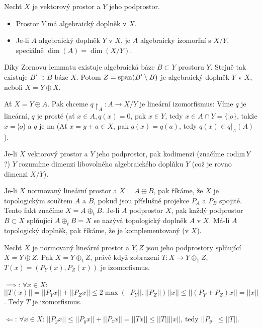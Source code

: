\documentclass[12pt]{article}					%
\begin{document}
\begin{veta}
	Nechť $X$ je vektorový prostor a $Y$ jeho podprostor.

	\begin{itemize}
		\item Prostor $Y$ má algebraický doplněk v $X$.
		\item Je-li $A$ algebraický doplněk $Y$ v $X$, je $A$ algebraicky izomorfní s $X / Y$, speciálně $\dim(A) = \dim(X / Y)$.
	\end{itemize}

	\begin{dukazin}
		Díky Zornovu lemmatu existuje algebraická báze $B \subset Y$ prostoru $Y$. Stejně tak existuje $B' \supset B$ báze $X$. Potom $Z = \operatorname{span}(B' \setminus B)$ je algebraický doplněk $Y$ v $X$, neboli $X = Y \oplus X$.


		Ať $X = Y \oplus A$. Pak chceme $q\upharpoonright_A: A \rightarrow X / Y$ je lineární izomorfismus: Víme $q$ je lineární, $q$ je prosté (ať $x \in A, q(x) = 0$, pak $x \in Y$, tedy $x \in A \cap Y = \{¦o\}$, takže $x = ¦o$) a $q$ je na (Ať $x = y + a \in X$, pak $q(x) = q(a)$, tedy $q(x) \in q|_A(A)$). 
	\end{dukazin}
\end{veta}

\begin{definice}[Kodimenze]
	Je-li $X$ vektorový prostor a $Y$ jeho podprostor, pak kodimenzí (značíme $\operatorname{codim} Y$?) $Y$ rozumíme dimenzi libovolného algebraického doplňku $Y$ (což je rovno dimenzi $X / Y$).
\end{definice}

\begin{definice}
	Je-li $X$ normovaný lineární prostor a $X = A \oplus B$, pak říkáme, že $X$ je topologickým součtem $A$ a $B$, pokud jsou příslušné projekce $P_A$ a $P_B$ spojité. Tento fakt značíme $X = A \oplus_t B$. Je-li $A$ podprostor $X$, pak každý podprostor $B \subset X$ splňující $A \oplus_t B = X$ se nazývá topologický doplněk $A$ v $X$. Má-li $A$ topologický doplněk, pak říkáme, že je komplementovaný (v $X$).
\end{definice}

\begin{veta}
	Nechť $X$ je normovaný lineární prostor a $Y, Z$ jsou jeho podprostory splňující $X = Y \oplus Z$. Pak $X = Y \oplus_t Z$, právě když zobrazení $T: X \rightarrow Y \oplus_1 Z$, $T(x) = (P_Y(x), P_Z(x))$ je izomorfismus.

	\begin{dukazin}
		$\implies$: $\forall x \in X$: $||T(x)|| = ||P_Y x|| + ||P_Z x|| ≤ 2\max (||P_Y||, ||P_Z||) ||x|| ≤ ||(P_Y + P_Z)x|| = ||x||$. Tedy $T$ je izomorfismus.

		$\Leftarrow$: $\forall x \in X$: $||P_yx|| ≤ ||P_yx|| + ||P_z x|| = ||T x|| ≤ ||T|| ||x||$, tedy $||P_y|| ≤ ||T||$.
	\end{dukazin}
\end{veta}
\end{document}

